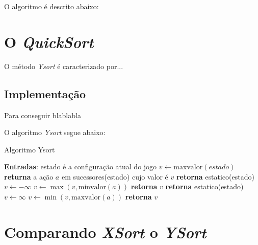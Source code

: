 \documentclass[a4paper,10pt]{article} %
\begin{document}
O algoritmo é descrito abaixo:

\section{O \textit{QuickSort}}

O método \emph{Ysort} é caracterizado por...


\subsection{Implementação}

Para conseguir blablabla

O algoritmo \textit{Ysort} segue abaixo:

\begin{algorithm}
\caption{Algoritmo Ysort}\label{alg:ysort}
\begin{algorithmic}[1]
\State \textbf{Entradas}: estado é a configuração atual do jogo
\State $v\gets \mathrm{maxvalor}{(estado)}$
\State \textbf{returna} a ação $a$ em sucessores(estado) cujo valor é $v$ %
\EndFunction
{}
   \State \textbf{retorna} estatico(estado)
\EndIf
\State $v \gets -\infty$
    \State $v \gets \max{(v, \mathrm{minvalor}(a))}$
\EndFor
\State \textbf{retorna} $v$
\EndFunction
{}
   \State \textbf{retorna} estatico(estado)
\EndIf
\State $v \gets \infty$
    \State $v \gets \min{(v, \mathrm{maxvalor}(a))}$
\EndFor
\State \textbf{retorna} $v$
\EndFunction
\end{algorithmic}
\end{algorithm}

\section{Comparando \textit{XSort} o \textit{YSort}}
\end{document}
